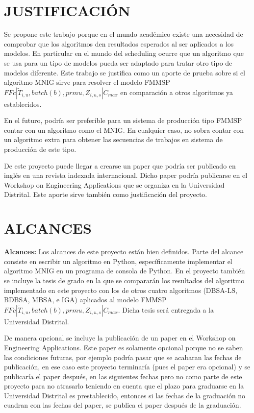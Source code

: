 \documentclass{article}
\def\notac_modelo{$FFc | \tilde{T}_{i, u}, batch(b), prmu, Z_{i, u, s} | C_{max}$}
\begin{document}
\section{JUSTIFICACIÓN}

Se propone este trabajo porque en el mundo académico existe una necesidad de comprobar que los algoritmos den resultados esperados al ser aplicados a los modelos. En particular en el mundo del scheduling ocurre que un algoritmo que se usa para un tipo de modelos pueda ser adaptado para tratar otro tipo de modelos diferente. Este trabajo se justifica como un aporte de prueba sobre si el algoritmo MNIG sirve para resolver el modelo FMMSP \notac_modelo en comparación a otros algoritmos ya establecidos.

\vspace{\baselineskip}
En el futuro, podría ser preferible para un sistema de producción tipo \linebreak FMMSP contar con un algoritmo como el MNIG. En cualquier caso, no sobra contar con un algoritmo extra para obtener las secuencias de trabajos en sistema de producción de este tipo.

\vspace{\baselineskip}
De este proyecto puede llegar a crearse un paper que podría ser publicado en inglés en una revista indexada internacional. Dicho paper podría publicarse en el Workshop on Engineering Applications que se organiza en la Universidad Distrital. Este aporte sirve también como justificación del proyecto.

\section{ALCANCES}

\textbf{Alcances:} Los alcances de este proyecto están bien definidos. Parte del alcance consiste en escribir un algoritmo en Python, específicamente implementar el algoritmo MNIG en un programa de consola de Python. En el proyecto también se incluye la tesis de grado en la que se compararán los resultados del algoritmo implementado en este proyecto con los de otros cuatro algoritmos (DBSA-LS, BDBSA, MBSA, e IGA) aplicados al modelo FMMSP \linebreak \notac_modelo. Dicha tesis será entregada a la Universidad Distrital.

\vspace{\baselineskip}
De manera opcional se incluye la publicación de un paper en el Workshop on Engineering Applications. Este paper es solamente opcional porque no se saben las condiciones futuras, por ejemplo podría pasar que se acabaran las fechas de publicación, en ese caso este proyecto terminaría (pues el paper era opcional) y se publicaría el paper después, en las siguientes fechas pero no como parte de este proyecto para no atrasarlo teniendo en cuenta que el plazo para graduarse en la Universidad Distrital es prestablecido, entonces si las fechas de la graduación no cuadran con las fechas del paper, se publica el paper después de la graduación.
\end{document}
